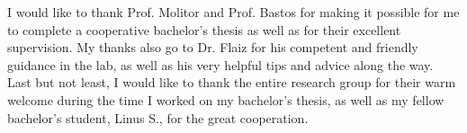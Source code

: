 
I would like to thank Prof. Molitor and Prof. Bastos for making it possible for me to complete a cooperative bachelor's thesis as well as for their excellent supervision. My thanks also go to  Dr. Flaiz for his competent and friendly guidance in the lab, as well as his very helpful tips and advice along the way. Last but not least, I would like to thank the entire research group for their warm welcome during the time I worked on my bachelor's thesis, as well as my fellow bachelor's student, Linus S., for the great cooperation.